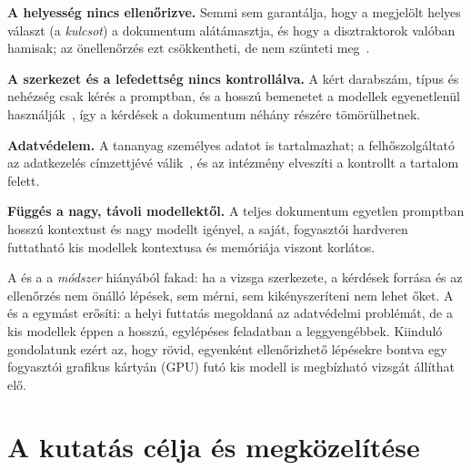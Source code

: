 \begin{description}[leftmargin=1.1cm,labelwidth=0.9cm,style=sameline,format=\normalfont\bfseries]
\item[(\textsf{\textbf{P1}})]\label{prob:P1} \textbf{A helyesség nincs ellenőrizve.} Semmi sem garantálja, hogy a megjelölt helyes választ (a
\emph{kulcsot}) a dokumentum alátámasztja, és hogy a disztraktorok valóban hamisak; az önellenőrzés ezt
csökkentheti, de nem szünteti meg~\cite{huang2024selfcorrect}.
\item[(\textsf{\textbf{P2}})]\label{prob:P2} \textbf{A szerkezet és a lefedettség nincs kontrollálva.} A kért darabszám, típus és nehézség
csak kérés a promptban, és a hosszú bemenetet a modellek egyenetlenül használják~\cite{liu2024lost}, így a
kérdések a dokumentum néhány részére tömörülhetnek.
\item[(\textsf{\textbf{P3}})]\label{prob:P3} \textbf{Adatvédelem.} A tananyag személyes adatot is tartalmazhat; a felhőszolgáltató az
adatkezelés címzettjévé válik~\cite{gdpr2016}, és az intézmény elveszíti a kontrollt a tartalom felett.
\item[(\textsf{\textbf{P4}})]\label{prob:P4} \textbf{Függés a nagy, távoli modellektől.} A teljes dokumentum egyetlen promptban hosszú
kontextust és nagy modellt igényel, a saját, fogyasztói hardveren futtatható kis modellek kontextusa és
memóriája viszont korlátos.
\end{description}

A  és a  a \emph{módszer} hiányából fakad: ha a vizsga szerkezete, a kérdések forrása és az ellenőrzés nem
önálló lépések, sem mérni, sem kikényszeríteni nem lehet őket. A  és a  egymást erősíti: a helyi futtatás
megoldaná az adatvédelmi problémát, de a kis modellek éppen a hosszú, egylépéses feladatban a leggyengébbek.
Kiinduló gondolatunk ezért az, hogy rövid, egyenként ellenőrizhető lépésekre bontva egy fogyasztói grafikus
kártyán (GPU) futó kis modell is megbízható vizsgát állíthat elő.

\section{A kutatás célja és megközelítése}

